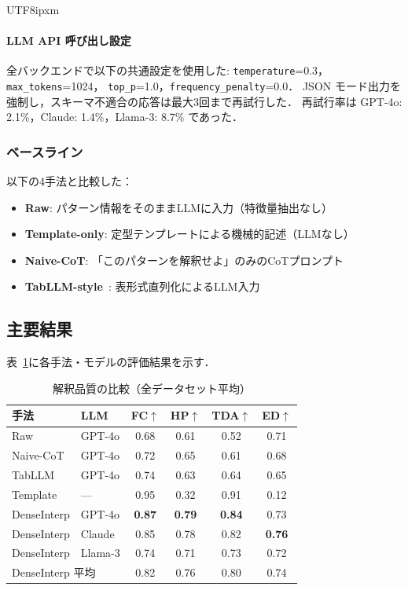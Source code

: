 \documentclass[conference]{IEEEtran}
\begin{document}
\begin{CJK}{UTF8}{ipxm}
\paragraph{LLM API 呼び出し設定}
全バックエンドで以下の共通設定を使用した:
\texttt{temperature}=0.3，\texttt{max\_tokens}=1024，
\texttt{top\_p}=1.0，\texttt{frequency\_penalty}=0.0．
JSON モード出力を強制し，スキーマ不適合の応答は最大3回まで再試行した．
再試行率は GPT-4o: 2.1\%，Claude: 1.4\%，Llama-3: 8.7\% であった．

\subsubsection{ベースライン}
以下の4手法と比較した：
\begin{itemize}[nosep]
    \item \textbf{Raw}: パターン情報をそのままLLMに入力（特徴量抽出なし）
    \item \textbf{Template-only}: 定型テンプレートによる機械的記述（LLMなし）
    \item \textbf{Naive-CoT}: 「このパターンを解釈せよ」のみのCoTプロンプト
    \item \textbf{TabLLM-style}~\cite{hegselmann2023tabllm}: 表形式直列化によるLLM入力
\end{itemize}

\subsection{主要結果}

表~\ref{tab:results}に各手法・モデルの評価結果を示す．

\begin{table}[t]
\centering
\caption{解釈品質の比較（全データセット平均）}
\label{tab:results}
\begin{tabular}{llcccc}
\toprule
手法 & LLM & FC$\uparrow$ & HP$\uparrow$ & TDA$\uparrow$ & ED$\uparrow$ \\
\midrule
Raw & GPT-4o & 0.68 & 0.61 & 0.52 & 0.71 \\
Naive-CoT & GPT-4o & 0.72 & 0.65 & 0.61 & 0.68 \\
TabLLM & GPT-4o & 0.74 & 0.63 & 0.64 & 0.65 \\
Template & --- & 0.95 & 0.32 & 0.91 & 0.12 \\
\midrule
DenseInterp & GPT-4o & \textbf{0.87} & \textbf{0.79} & \textbf{0.84} & 0.73 \\
DenseInterp & Claude & 0.85 & 0.78 & 0.82 & \textbf{0.76} \\
DenseInterp & Llama-3 & 0.74 & 0.71 & 0.73 & 0.72 \\
\midrule
\multicolumn{2}{l}{DenseInterp 平均} & 0.82 & 0.76 & 0.80 & 0.74 \\
\bottomrule
\end{tabular}
\end{table}


\end{CJK}
\end{document}
